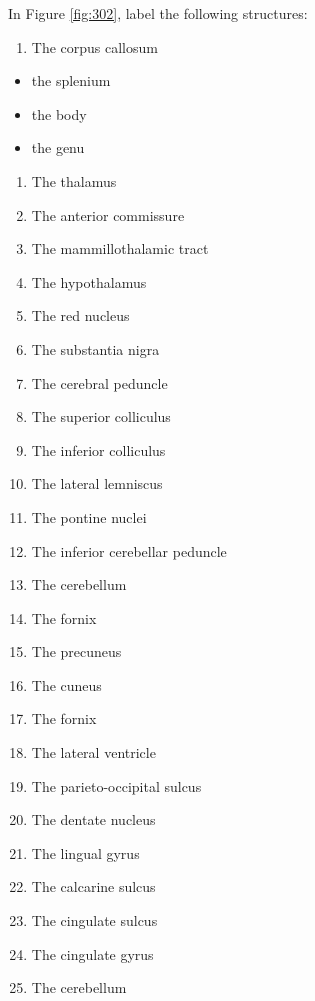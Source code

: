 \documentclass[]{book}
\providecommand{\tightlist}{%
  \setlength{\itemsep}{0pt}\setlength{\parskip}{0pt}}
\begin{document}
In Figure \ref{fig:302}, label the following structures:

\begin{enumerate}
\def\labelenumi{\arabic{enumi}.}
\tightlist
\item
  The corpus callosum
\end{enumerate}

\begin{itemize}
\tightlist
\item
  the splenium
\item
  the body
\item
  the genu
\end{itemize}

\begin{enumerate}
\def\labelenumi{\arabic{enumi}.}
\tightlist
\item
  The thalamus
\item
  The anterior commissure
\item
  The mammillothalamic tract
\item
  The hypothalamus
\item
  The red nucleus
\item
  The substantia nigra
\item
  The cerebral peduncle
\item
  The superior colliculus
\item
  The inferior colliculus
\item
  The lateral lemniscus
\item
  The pontine nuclei
\item
  The inferior cerebellar peduncle
\item
  The cerebellum
\item
  The fornix
\item
  The precuneus
\item
  The cuneus
\item
  The fornix
\item
  The lateral ventricle
\item
  The parieto-occipital sulcus
\item
  The dentate nucleus
\item
  The lingual gyrus
\item
  The calcarine sulcus
\item
  The cingulate sulcus
\item
  The cingulate gyrus
\item
  The cerebellum
\end{enumerate}
\end{document}
